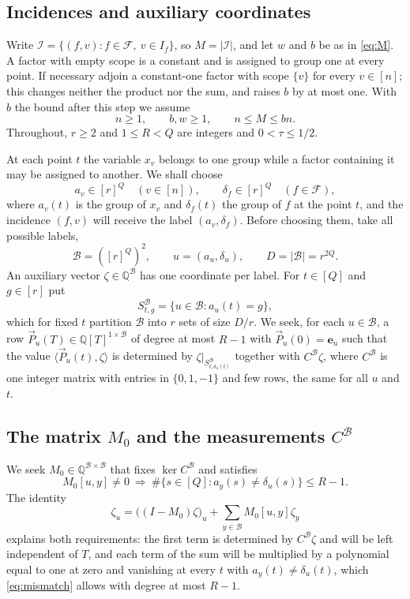 \documentclass[11pt,reqno]{amsart}
\numberwithin{equation}{section}
\theoremstyle{plain}
\theoremstyle{definition}
\theoremstyle{remark}
\newcommand{\F}{\mathcal{F}}
\newcommand{\B}{\mathcal{B}}
\newcommand{\Q}{\mathbb{Q}}
\newcommand{\e}{\mathbf{e}}
\newcommand{\PP}{\vec{P}}
\newcommand{\ip}[2]{\langle #1,#2\rangle}
\begin{document}
\subsection{Incidences and auxiliary coordinates}
Write $\mathcal I=\{(f,v):f\in\F,\ v\in I_f\}$, so $M=|\mathcal I|$, and let
$w$ and $b$ be as in \eqref{eq:M}. A factor with empty scope is a constant and is
assigned to group one at every point. If necessary adjoin a constant-one factor
with scope $\{v\}$ for every $v\in[n]$; this changes neither the product nor the
sum, and raises $b$ by at most one. With $b$ the bound after this step we assume
\begin{equation}\label{eq:nMb}
  n\ge1,\qquad b,w\ge1,\qquad n\le M\le bn .
\end{equation}
Throughout, $r\ge2$ and $1\le R<Q$ are integers and $0<\tau\le1/2$.

At each point $t$ the variable $x_v$ belongs to one group while a factor
containing it may be assigned to another. We shall choose
\[
  a_v\in[r]^{Q}\quad(v\in[n]),\qquad \delta_f\in[r]^{Q}\quad(f\in\F),
\]
where $a_v(t)$ is the group of $x_v$ and $\delta_f(t)$ the group of $f$ at the
point $t$, and the incidence $(f,v)$ will receive the label $(a_v,\delta_f)$.
Before choosing them, take all possible labels,
\begin{equation}\label{eq:B}
  \B=([r]^{Q})^2,\qquad u=(a_u,\delta_u),\qquad D=|\B|=r^{2Q}.
\end{equation}
An auxiliary vector $\zeta\in\Q^{\B}$ has one coordinate per label. For $t\in[Q]$
and $g\in[r]$ put
\begin{equation}\label{eq:SB}
  S^{\B}_{t,g}=\{u\in\B:a_u(t)=g\},
\end{equation}
which for fixed $t$ partition $\B$ into $r$ sets of size $D/r$. We seek, for each
$u\in\B$, a row $\PP_u(T)\in\Q[T]^{1\times\B}$ of degree at most $R-1$ with
$\PP_u(0)=\e_u$ such that the value $\ip{\PP_u(t)}{\zeta}$ is determined by
$\zeta|_{S^{\B}_{t,\delta_u(t)}}$ together with $C^{\B}\zeta$, where $C^{\B}$ is one
integer matrix with entries in $\{0,1,-1\}$ and few rows, the same for all $u$ and
$t$.

\subsection{The matrix $M_0$ and the measurements $C^{\B}$}
We seek $M_0\in\Q^{\B\times\B}$ that fixes $\ker C^{\B}$ and satisfies
\begin{equation}\label{eq:mismatch}
  M_0[u,y]\ne0\ \Longrightarrow\ \#\{s\in[Q]:a_y(s)\ne\delta_u(s)\}\le R-1 .
\end{equation}
The identity
\begin{equation}\label{eq:split}
  \zeta_u=\bigl((I-M_0)\zeta\bigr)_u+\sum_{y\in\B}M_0[u,y]\zeta_y
\end{equation}
explains both requirements: the first term is determined by $C^{\B}\zeta$ and
will be left independent of $T$, and each term of the sum will be multiplied by a
polynomial equal to one at zero and vanishing at every $t$ with
$a_y(t)\ne\delta_u(t)$, which \eqref{eq:mismatch} allows with degree at most
$R-1$.
\end{document}
